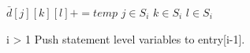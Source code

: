 \documentclass[oneside]{article}
\begin{document}
\begin{algorithm*}[!htb]
\begin{algorithmic}[1]
\begin{varwidth}[t]{\linewidth}
\end{varwidth}
\State  $\bar{d}[j][k][l] += temp$
\State  $j \in S_i$
\State  $k \in S_i$
\State  $l \in S_i$
\EndIf


\EndFor
\EndFor
\EndFor
\If i > 1
\State Push statement level variables to entry[i-1].
\EndIf
\EndFor
  
\end{algorithmic}
 \end{algorithm*} 
 
\end{document}
